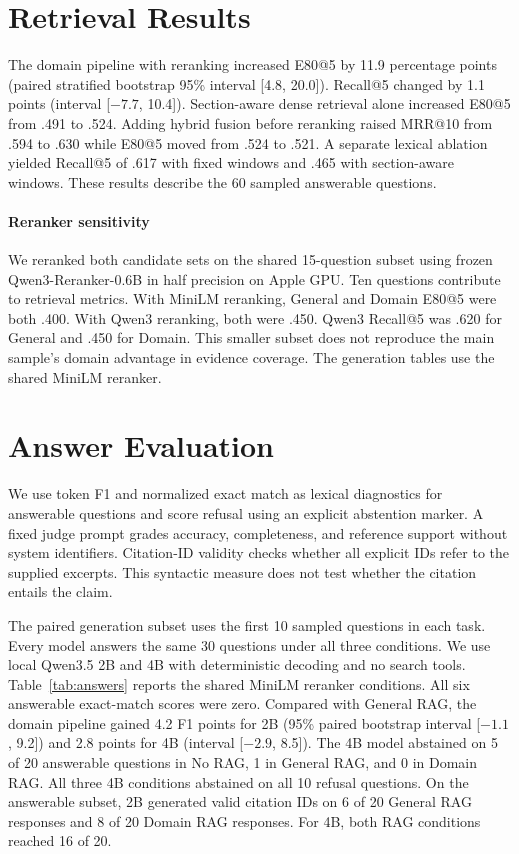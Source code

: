 \documentclass[11pt]{article}
\begin{document}
\section{Retrieval Results}

The domain pipeline with reranking increased E80@5 by 11.9 percentage points (paired stratified bootstrap 95\% interval [4.8, 20.0]). Recall@5 changed by 1.1 points (interval [$-7.7$, 10.4]). Section-aware dense retrieval alone increased E80@5 from .491 to .524. Adding hybrid fusion before reranking raised MRR@10 from .594 to .630 while E80@5 moved from .524 to .521. A separate lexical ablation yielded Recall@5 of .617 with fixed windows and .465 with section-aware windows. These results describe the 60 sampled answerable questions. 
\paragraph{Reranker sensitivity}
We reranked both candidate sets on the shared 15-question subset using frozen Qwen3-Reranker-0.6B in half precision on Apple GPU. Ten questions contribute to retrieval metrics. With MiniLM reranking, General and Domain E80@5 were both .400. With Qwen3 reranking, both were .450. Qwen3 Recall@5 was .620 for General and .450 for Domain. This smaller subset does not reproduce the main sample's domain advantage in evidence coverage. The generation tables use the shared MiniLM reranker.
\section{Answer Evaluation}
We use token F1 and normalized exact match as lexical diagnostics for answerable questions and score refusal using an explicit abstention marker. A fixed judge prompt grades accuracy, completeness, and reference support without system identifiers. Citation-ID validity checks whether all explicit IDs refer to the supplied excerpts. This syntactic measure does not test whether the citation entails the claim.

The paired generation subset uses the first 10 sampled questions in each task. Every model answers the same 30 questions under all three conditions. We use local Qwen3.5 2B and 4B with deterministic decoding and no search tools. Table~\ref{tab:answers} reports the shared MiniLM reranker conditions. All six answerable exact-match scores were zero. Compared with General RAG, the domain pipeline gained 4.2 F1 points for 2B (95\% paired bootstrap interval [$-1.1$, 9.2]) and 2.8 points for 4B (interval [$-2.9$, 8.5]).
The 4B model abstained on 5 of 20 answerable questions in No RAG, 1 in General RAG, and 0 in Domain RAG. All three 4B conditions abstained on all 10 refusal questions. On the answerable subset, 2B generated valid citation IDs on 6 of 20 General RAG responses and 8 of 20 Domain RAG responses. For 4B, both RAG conditions reached 16 of 20.
\end{document}
